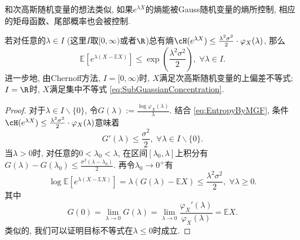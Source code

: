 和次高斯随机变量的想法类似, 如果$e^{\lambda X}$的熵能被Gauss随机变量的熵所控制, 相应的矩母函数、尾部概率也会被控制.
\begin{theorem}[Herbst方法]\label{thm:HerbstArgument}
	若对任意的$\lambda \in I$ (这里$I$取$[0, \infty)$或者$\R$)总有熵$\cH(e^{\lambda X}) \leq \frac{\lambda^2 \sigma^2}{2} \cdot \varphi_X(\lambda)$, 那么
	\begin{equation*}
		\mathbb{E}\left[e^{\lambda(X - \mathbb{E}X)}\right] 
		\leq \exp \left( \frac{\lambda^2 \sigma^2}{2} \right),\; 
		\forall \lambda \in I. 
	\end{equation*}
	进一步地, 由Chernoff方法, $I = [0, \infty)$时, $X$满足次高斯随机变量的上偏差不等式; $I = \R$时, $X$满足集中不等式 \eqref{eq:SubGuassianConcentration}.
\end{theorem}
\begin{proof}
	对于$\lambda \in I \backslash \{0\}$, 令$G(\lambda) := \frac{\log \varphi_X(\lambda)}{\lambda}$. 
	结合 \eqref{eq:EntropyByMGF}, 条件$\cH(e^{\lambda X}) \leq \frac{\lambda^2 \sigma^2}{2} \cdot \varphi_X(\lambda)$意味着
	\begin{equation*}
		G'(\lambda) \leq \frac{\sigma^2}{2},\; \forall \lambda \in I \backslash \{0\}. 
	\end{equation*}
	当$\lambda > 0$时, 对任意的$0 < \lambda_0 < \lambda$, 在区间$[\lambda_0, \lambda]$上积分有$G(\lambda) - G(\lambda_0) \leq \frac{\sigma^2 (\lambda - \lambda_0)}{2}$. 
	再令$\lambda_0 \to 0^+$有
	\begin{equation*}
		\log \mathbb{E}\left[e^{\lambda(X - \mathbb{E}X)}\right]
		= \lambda(G(\lambda) - \mathbb{E}X)
		\leq \frac{\lambda^2 \sigma^2}{2} ,\; 
		\forall \lambda \geq 0. 
	\end{equation*}
	其中
	\begin{equation*}
		G(0) 
		= \lim_{\lambda \to 0} G(\lambda) 
		= \lim_{\lambda \to 0} \frac{\varphi_X'(\lambda)}{\varphi_X(\lambda)}
		= \mathbb{E}X. 
	\end{equation*}
	类似的, 我们可以证明目标不等式在$\lambda \leq 0$时成立. 
\end{proof}

